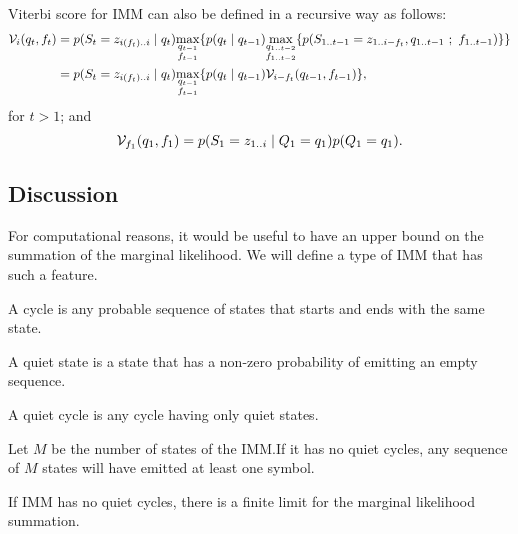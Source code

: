 Viterbi score for IMM can also be defined in a recursive way as follows:
\begin{equation*}
  \begin{split}
    \mathcal{V}_{i}(q_t,f_t)
    &= p(S_t=z_{i(f_t)..i} \;|\; q_t)
      \underset{\substack{q_{t-1}\\f_{t-1}}}{\max}
      \{
        p(q_t \;|\; q_{t-1})
        \underset{\substack{q_{1..t-2}\\f_{1..t-2}}}{\max}
        \{
          p(S_{1..t-1}=z_{1..i-f_t}, q_{1..t-1} ~;~ f_{1..t-1})
        \}
      \}\\
    &= p(S_t=z_{i(f_t)..i} \;|\; q_t)
      \underset{\substack{q_{t-1}\\f_{t-1}}}{\max}
      \{
        p(q_t \;|\; q_{t-1}) \mathcal{V}_{i-f_t}(q_{t-1},f_{t-1})
      \},
  \end{split}
\end{equation*}
for $t>1$; and
\begin{equation*}
  \mathcal{V}_{f_1}(q_1,f_1) = p(S_1=z_{1..i} \;|\; Q_1=q_1) p(Q_1=q_1).
\end{equation*}

\subsection{Discussion}

For computational reasons, it would be useful to have an upper bound on the summation of the
marginal likelihood.
We will define a type of IMM that has such a feature.

\begin{definition}
  A cycle is any probable sequence of states that starts and ends with the same state.
\end{definition}

\begin{definition}
  A quiet state is a state that has a non-zero probability of emitting an empty sequence.
\end{definition}

\begin{definition}
  A quiet cycle is any cycle having only quiet states.
\end{definition}

\begin{corollary}
  Let $M$ be the number of states of the IMM.\@ If it has no quiet cycles, any sequence of $M$ states
  will have emitted at least one symbol.
\end{corollary}

If IMM has no quiet cycles, there is a finite limit for the marginal likelihood summation.
